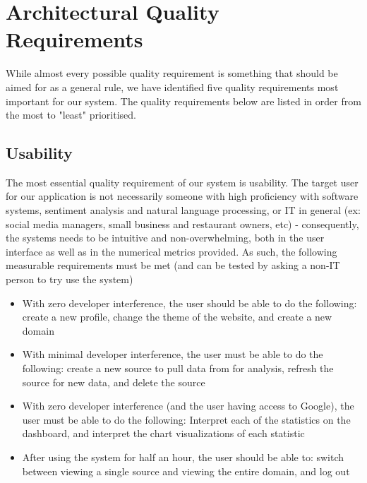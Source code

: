\documentclass[12pt]{article}
\begin{document}
\section{Architectural Quality Requirements}
While almost every possible quality requirement is something that should be aimed for as a general rule, we have identified five quality requirements most important for our system. The quality requirements below are listed in order from the most to "least" prioritised.
\subsection{Usability}
The most essential quality requirement of our system is usability. The target user for our application is not necessarily someone with high proficiency with software systems, sentiment analysis and natural language processing, or IT in general (ex: social media managers, small business and restaurant owners, etc) - consequently, the systems needs to be intuitive and non-overwhelming, both in the user interface as well as in the numerical metrics provided. As such, the following measurable requirements must be met (and can be tested by asking a non-IT person to try use the system)
\begin{itemize}
    \item With zero developer interference, the user should be able to do the following: create a new profile, change the theme of the website, and create a new domain
    \item With minimal developer interference, the user must be able to do the following: create a new source to pull data from for analysis, refresh the source for new data, and delete the source
    \item With zero developer interference (and the user having access to Google), the user must be able to do the following: Interpret each of the statistics on the dashboard, and interpret the chart visualizations of each statistic
    \item After using the system for half an hour, the user should be able to: switch between viewing a single source and viewing the entire domain, and log out
\end{itemize}
\end{document}
